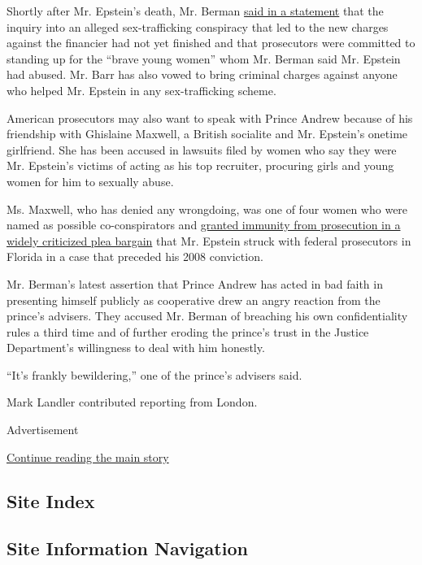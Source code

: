 Shortly after Mr. Epstein's death, Mr. Berman
\href{https://www.justice.gov/usao-sdny/pr/statement-manhattan-us-attorney-death-defendant-jeffrey-epstein}{said
in a statement} that the inquiry into an alleged sex-trafficking
conspiracy that led to the new charges against the financier had not yet
finished and that prosecutors were committed to standing up for the
``brave young women'' whom Mr. Berman said Mr. Epstein had abused. Mr.
Barr has also vowed to bring criminal charges against anyone who helped
Mr. Epstein in any sex-trafficking scheme.

American prosecutors may also want to speak with Prince Andrew because
of his friendship with Ghislaine Maxwell, a British socialite and Mr.
Epstein's onetime girlfriend. She has been accused in lawsuits filed by
women who say they were Mr. Epstein's victims of acting as his top
recruiter, procuring girls and young women for him to sexually abuse.

Ms. Maxwell, who has denied any wrongdoing, was one of four women who
were named as possible co-conspirators and
\href{https://www.nytimes.com/2019/07/10/us/politics/acosta-epstein.html}{granted
immunity from prosecution in a widely criticized plea bargain} that Mr.
Epstein struck with federal prosecutors in Florida in a case that
preceded his 2008 conviction.

Mr. Berman's latest assertion that Prince Andrew has acted in bad faith
in presenting himself publicly as cooperative drew an angry reaction
from the prince's advisers. They accused Mr. Berman of breaching his own
confidentiality rules a third time and of further eroding the prince's
trust in the Justice Department's willingness to deal with him honestly.

``It's frankly bewildering,'' one of the prince's advisers said.

Mark Landler contributed reporting from London.

Advertisement

\protect\hyperlink{after-bottom}{Continue reading the main story}

\hypertarget{site-index}{%
\subsection{Site Index}\label{site-index}}

\hypertarget{site-information-navigation}{%
\subsection{Site Information
Navigation}\label{site-information-navigation}}

